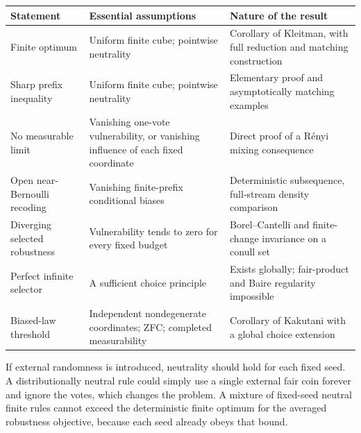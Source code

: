 \documentclass[11pt]{article}
\theoremstyle{definition}
\theoremstyle{remark}
\begin{document}
\begin{center}
\begin{tabularx}{\textwidth}{@{}P{0.29\textwidth}YY@{}}
\toprule
Statement & Essential assumptions & Nature of the result\\
\midrule
Finite optimum & Uniform finite cube; pointwise neutrality & Corollary of
Kleitman, with full reduction and matching construction\\[4pt]
Sharp prefix inequality & Uniform finite cube; pointwise neutrality &
Elementary proof and asymptotically matching examples\\[4pt]
No measurable limit & Vanishing one-vote vulnerability, or vanishing influence
of each fixed coordinate & Direct proof of a R\'enyi mixing consequence\\[4pt]
Open near-Bernoulli recoding & Vanishing finite-prefix conditional biases &
Deterministic subsequence, full-stream density comparison\\[4pt]
Diverging selected robustness & Vulnerability tends to zero for every fixed
budget & Borel--Cantelli and finite-change invariance on a conull set\\[4pt]
Perfect infinite selector & A sufficient choice principle & Exists globally;
fair-product and Baire regularity impossible\\[4pt]
Biased-law threshold & Independent nondegenerate coordinates; ZFC; completed
measurability & Corollary of Kakutani with a global choice extension\\
\bottomrule
\end{tabularx}
\end{center}

If external randomness is introduced, neutrality should hold for each fixed
seed. A distributionally neutral rule could simply use a single external fair
coin forever and ignore the votes, which changes the problem. A mixture of
fixed-seed neutral finite rules cannot exceed the deterministic finite optimum
for the averaged robustness objective, because each seed already obeys that
bound.
\end{document}

